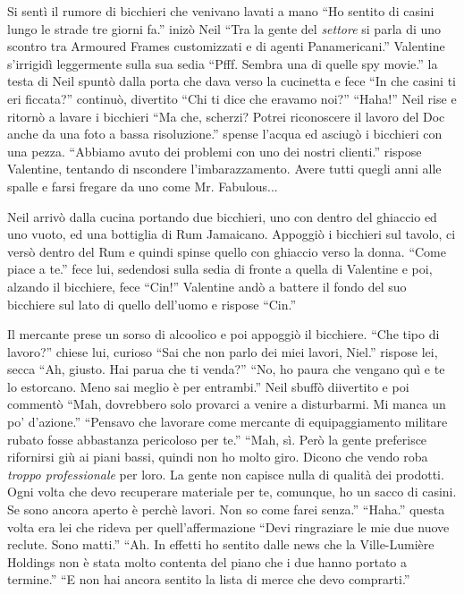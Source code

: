     Si sentì il rumore di bicchieri che venivano lavati a mano ``Ho sentito di casini lungo le strade tre giorni fa.''
    inizò Neil ``Tra la gente del \emph{settore} si parla di uno scontro tra Armoured Frames customizzati e di agenti
    Panamericani.'' Valentine s'irrigidì leggermente sulla sua sedia ``Pfff. Sembra una di quelle spy movie.'' la testa
    di Neil spuntò dalla porta che dava verso la cucinetta e fece ``In che casini ti eri ficcata?'' continuò, divertito
    ``Chi ti dice che eravamo noi?'' ``Haha!'' Neil rise e ritornò a lavare i bicchieri ``Ma che, scherzi? Potrei
    riconoscere il lavoro del Doc anche da una foto a bassa risoluzione.'' spense l'acqua ed asciugò i bicchieri con una
    pezza. ``Abbiamo avuto dei problemi con uno dei nostri clienti.'' rispose Valentine, tentando di nscondere
    l'imbarazzamento. Avere tutti quegli anni alle spalle e farsi fregare da uno come Mr. Fabulous...

    Neil arrivò dalla cucina portando due bicchieri, uno con dentro del ghiaccio ed uno vuoto, ed una bottiglia di Rum
    Jamaicano. Appoggiò i bicchieri sul tavolo, ci versò dentro del Rum e quindi spinse quello con ghiaccio verso la
    donna. ``Come piace a te.'' fece lui, sedendosi sulla sedia di fronte a quella di Valentine e poi, alzando il
    bicchiere, fece ``Cin!'' Valentine andò a battere il fondo del suo bicchiere sul lato di quello dell'uomo e rispose
    ``Cin.''

    Il mercante prese un sorso di alcoolico e poi appoggiò il bicchiere. ``Che tipo di lavoro?'' chiese lui, curioso
    ``Sai che non parlo dei miei lavori, Niel.'' rispose lei, secca ``Ah, giusto. Hai parua che ti venda?'' ``No, ho
    paura che vengano quì e te lo estorcano. Meno sai meglio è per entrambi.'' Neil sbuffò diivertito e poi commentò
    ``Mah, dovrebbero solo provarci a venire a disturbarmi. Mi manca un po' d'azione.'' ``Pensavo che lavorare come
    mercante di equipaggiamento militare rubato fosse abbastanza pericoloso per te.'' ``Mah, sì. Però la gente
    preferisce rifornirsi giù ai piani bassi, quindi non ho molto giro. Dicono che vendo roba \emph{troppo professionale} per
    loro. La gente non capisce nulla di qualità dei prodotti. Ogni volta che devo recuperare materiale per te,
    comunque, ho un sacco di casini. Se sono ancora aperto è perchè lavori. Non so come farei senza.'' ``Haha.'' questa
    volta era lei che rideva per quell'affermazione ``Devi ringraziare le mie due nuove reclute. Sono matti.'' ``Ah. In
    effetti ho sentito dalle news che la Ville-Lumière Holdings non è stata molto contenta del piano che i due hanno
    portato a termine.'' ``E non hai ancora sentito la lista di merce che devo comprarti.''

